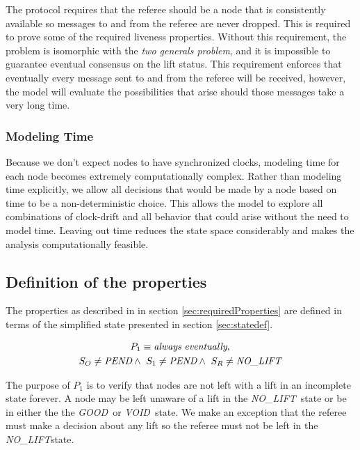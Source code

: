 \documentclass[runningheads]{llncs}
\newcommand{\originatorstate}{S_O}
\newcommand{\relayastate}{S_1}
\newcommand{\refstate}{S_R}
\newcommand{\nolift}{\emph{NO\_LIFT}}
\newcommand{\pend}{\emph{PEND}}
\newcommand{\void}{\emph{VOID}}
\newcommand{\good}{\emph{GOOD}}
\newcommand{\always}{\emph{always}}
\newcommand{\eventually}{\emph{eventually}}
\begin{document}
The protocol requires that the referee should be a node that is consistently available so messages to and from the referee are never dropped. This is required to prove some of the required liveness properties. Without this requirement, the problem is isomorphic with the \emph{two generals problem}, and it is impossible to guarantee eventual consensus on the lift status. This requirement enforces that eventually every message sent to and from the referee will be received, however, the model will evaluate the possibilities that arise should those messages take a very long time. 

\subsubsection{Modeling Time}
\label{sec:model_time}
Because we don't expect nodes to have synchronized clocks, modeling time for each node becomes extremely computationally complex. Rather than modeling time explicitly, we allow all decisions that would be made by a node based on time to be a non-deterministic choice. This allows the model to explore all combinations of clock-drift and all behavior that could arise without the need to model time. Leaving out time reduces the state space considerably and makes the analysis computationally feasible. 

\subsection{Definition of the properties}
The properties as described in in section \ref{sec:requiredProperties} are defined in terms of the simplified state presented in section \ref{sec:statedef}. 

\begin{definition}[Property 1]
\begin{multline*}
    P_1 \equiv \always\ \eventually,\\
    \originatorstate \neq \pend \wedge\ \relayastate \neq \pend \wedge\ \refstate \neq \nolift\\
\end{multline*}
\end{definition}
The purpose of $P_1$ is to verify that nodes are not left with a lift in an incomplete state forever. A node may be left unaware of a lift in the \nolift\ state or be in either the the \good\ or \void\ state. We make an exception that the referee must make a decision about any lift so the referee must not be left in the \nolift state. 
\end{document}
